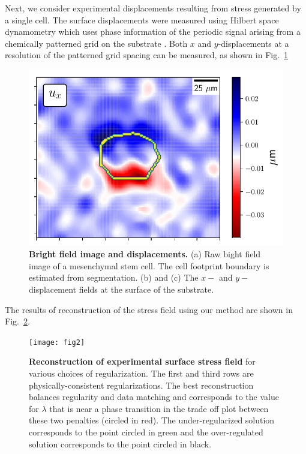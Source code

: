 \documentclass[aps,prl,reprint,twocolumn,groupedaddress,showpacs]{revtex4}
\begin{document}
Next, we consider experimental displacements resulting from stress
generated by a single cell. The surface displacements were measured
using Hilbert space dynamometry which uses phase information of the
periodic signal arising from a chemically patterned grid on the
substrate \cite{POPESCU}.  Both $x$ and $y$-displacements at a
resolution of the patterned grid spacing can be measured, as shown in
Fig.~\ref{DATA}

\begin{figure}
\includegraphics[width=\linewidth]{fig0a}
\caption{\textbf{Bright field image and displacements.} (a) Raw bight
  field image of a mesenchymal stem cell. The cell footprint boundary
  is estimated from segmentation. (b) and (c) The $x-$ and
  $y-$displacement fields at the surface of the substrate.}
\label{DATA}
\end{figure}
%
The results of reconstruction of the stress field using our method are
shown in Fig.~\ref{fig:fig2}.

\begin{figure}
\texttt{[image: fig2]}
\caption{\textbf{Reconstruction of experimental surface stress field} for various
  choices of regularization. The first and third rows are
  physically-consistent regularizations. The best reconstruction
  balances regularity and data matching and corresponds to the value
  for $\lambda$ that is near a phase transition in the trade off plot
  between these two penalties (circled in red). The under-regularized
  solution corresponds to the point circled in green and the
  over-regulated solution corresponds to the point circled in black.}
\label{fig:fig2}
\end{figure}
\end{document}
